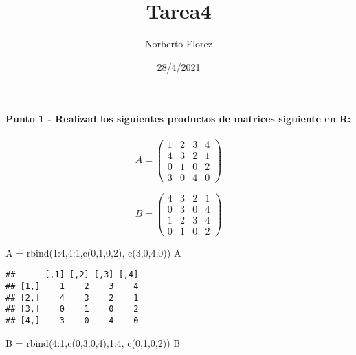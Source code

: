 \documentclass[
]{article}
\title{Tarea4}
\author{Norberto Florez}
\date{28/4/2021}
\newenvironment{Shaded}{\begin{snugshade}}{\end{snugshade}}
\newcommand{\DecValTok}[1]{\textcolor[rgb]{0.00,0.00,0.81}{#1}}
\newcommand{\FunctionTok}[1]{\textcolor[rgb]{0.00,0.00,0.00}{#1}}
\newcommand{\NormalTok}[1]{#1}
\newcommand{\OtherTok}[1]{\textcolor[rgb]{0.56,0.35,0.01}{#1}}
\newcommand{\SpecialCharTok}[1]{\textcolor[rgb]{0.00,0.00,0.00}{#1}}
\begin{document}
\maketitle

\hypertarget{punto-1---realizad-los-siguientes-productos-de-matrices-siguiente-en-r}{%
\paragraph{Punto 1 - Realizad los siguientes productos de matrices
siguiente en
R:}\label{punto-1---realizad-los-siguientes-productos-de-matrices-siguiente-en-r}}

\[ A = \begin{equation*}\begin{pmatrix} 1 & 2 & 3 & 4\\ 4 & 3 & 2 & 1\\ 0 & 1 & 0 & 2 
\\ 3 & 0 & 4 & 0\end{pmatrix}\end{equation*}\]

\[ B = \begin{equation*}\begin{pmatrix} 4 & 3 & 2 & 1\\ 0 & 3 & 0 & 4
\\ 1 & 2 & 3 & 4\\ 0 & 1 & 0 & 2\end{pmatrix}\end{equation*}\]

\begin{Shaded}
\begin{Highlighting}[]
\NormalTok{A }\OtherTok{=} \FunctionTok{rbind}\NormalTok{(}\DecValTok{1}\SpecialCharTok{:}\DecValTok{4}\NormalTok{,}\DecValTok{4}\SpecialCharTok{:}\DecValTok{1}\NormalTok{,}\FunctionTok{c}\NormalTok{(}\DecValTok{0}\NormalTok{,}\DecValTok{1}\NormalTok{,}\DecValTok{0}\NormalTok{,}\DecValTok{2}\NormalTok{), }\FunctionTok{c}\NormalTok{(}\DecValTok{3}\NormalTok{,}\DecValTok{0}\NormalTok{,}\DecValTok{4}\NormalTok{,}\DecValTok{0}\NormalTok{))}
\NormalTok{A}
\end{Highlighting}
\end{Shaded}

\begin{verbatim}
##      [,1] [,2] [,3] [,4]
## [1,]    1    2    3    4
## [2,]    4    3    2    1
## [3,]    0    1    0    2
## [4,]    3    0    4    0
\end{verbatim}

\begin{Shaded}
\begin{Highlighting}[]
\NormalTok{B }\OtherTok{=} \FunctionTok{rbind}\NormalTok{(}\DecValTok{4}\SpecialCharTok{:}\DecValTok{1}\NormalTok{,}\FunctionTok{c}\NormalTok{(}\DecValTok{0}\NormalTok{,}\DecValTok{3}\NormalTok{,}\DecValTok{0}\NormalTok{,}\DecValTok{4}\NormalTok{),}\DecValTok{1}\SpecialCharTok{:}\DecValTok{4}\NormalTok{, }\FunctionTok{c}\NormalTok{(}\DecValTok{0}\NormalTok{,}\DecValTok{1}\NormalTok{,}\DecValTok{0}\NormalTok{,}\DecValTok{2}\NormalTok{))}
\NormalTok{B}
\end{Highlighting}
\end{Shaded}
\end{document}
